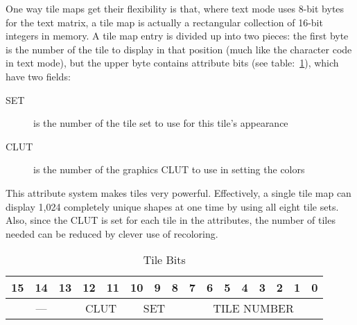 One way tile maps get their flexibility is that, where text mode uses 8-bit bytes for the text matrix, a tile map is actually a rectangular collection of 16-bit integers in memory. A tile map entry is divided up into two pieces: the first byte is the number of the tile to display in that position (much like the character code in text mode), but the upper byte contains attribute bits (see table:~\ref{tab:tile_bits}), which have two fields:

\begin{description}
    \item[SET] is the number of the tile set to use for this tile's appearance

    \item[CLUT] is the number of the graphics CLUT to use in setting the colors
\end{description}

This attribute system makes tiles very powerful. Effectively, a single tile map can display 1,024 completely unique shapes at one time by using all eight tile sets. Also, since the CLUT is set for each tile in the attributes, the number of tiles needed can be reduced by clever use of recoloring.

\begin{table}[h]
    \begin{center}
        \begin{tabular}{|c|c|c|c|c|c|c|c|c|c|c|c|c|c|c|c|} \hline
            15 & 14 & 13 & 12 & 11 & 10 & 9 & 8 & 7 & 6 & 5 & 4 & 3 & 2 & 1 & 0 \\ \hline
            \multicolumn{3}{|c|}{---} & \multicolumn{2}{|c|}{CLUT} & \multicolumn{3}{|c|}{SET} & \multicolumn{8}{|c|}{TILE NUMBER} \\ \hline
        \end{tabular}
    \end{center}
    \caption{Tile Bits}
    \label{tab:tile_bits}
\end{table}

